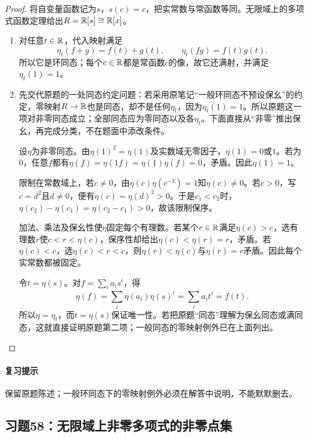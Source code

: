 \begin{proof}

将自变量函数记为$s$，$s(c)=c$，把实常数与常函数等同。无限域上的多项式函数定理给出$R=\mathbb R[s]\cong\mathbb R[x]$。
\begin{enumerate}[label=(\roman*)]
\item 对任意$t\in\mathbb R$，代入映射满足
\[
\eta_t(f+g)=f(t)+g(t),\qquad\eta_t(fg)=f(t)g(t).
\]
所以它是环同态；每个$c\in\mathbb R$都是常函数$c$的像，故它还满射，并满足$\eta_t(1)=1$。
\item 先交代原题的一处同态约定问题：若采用原笔记“一般环同态不预设保幺”的约定，零映射$R\to\mathbb R$也是同态，却不是任何$\eta_t$，因为$\eta_t(1)=1$。所以原题这一项对非零同态成立；全部同态应为零同态以及各$\eta_t$。下面直接从“非零”推出保幺，再完成分类，不在题面中添改条件。

设$\eta$为非零同态。由$\eta(1)^2=\eta(1)$及实数域无零因子，$\eta(1)=0$或$1$。若为$0$，任意$f$都有$\eta(f)=\eta(1f)=\eta(1)\eta(f)=0$，矛盾。因此$\eta(1)=1$。

限制在常数域上，若$c\ne0$，由$\eta(c)\eta(c^{-1})=1$知$\eta(c)\ne0$。若$c>0$，写$c=d^2$且$d\ne0$，便有$\eta(c)=\eta(d)^2>0$。于是$c_1<c_2$时，$\eta(c_2)-\eta(c_1)=\eta(c_2-c_1)>0$，故该限制保序。

加法、乘法及保幺性使$\eta$固定每个有理数。若某个$c\in\mathbb R$满足$\eta(c)>c$，选有理数$r$使$c<r<\eta(c)$，保序性却给出$\eta(c)<\eta(r)=r$，矛盾。若$\eta(c)<c$，选$\eta(c)<r<c$，则$\eta(r)<\eta(c)$与$\eta(r)=r$矛盾。因此每个实常数都被固定。

令$t=\eta(s)$。对$f=\sum_i a_is^i$，得
\[
\eta(f)=\sum_i\eta(a_i)\eta(s)^i=\sum_i a_it^i=f(t).
\]
所以$\eta=\eta_t$，而$t=\eta(s)$保证唯一性。若把原题“同态”理解为保幺同态或满同态，这就直接证明原题第二项；一般同态的零映射例外已在上面列出。
\end{enumerate}

\end{proof}

\paragraph{复习提示}

保留原题陈述；一般环同态下的零映射例外必须在解答中说明，不能默默删去。



\subsection{习题58：无限域上非零多项式的非零点集}

\label{ex:3:58}


